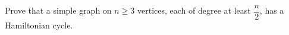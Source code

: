 Prove that a simple graph on $n\ge3$ vertices, each of degree at least $\dfrac{n}{2}$, has a Hamiltonian cycle.
